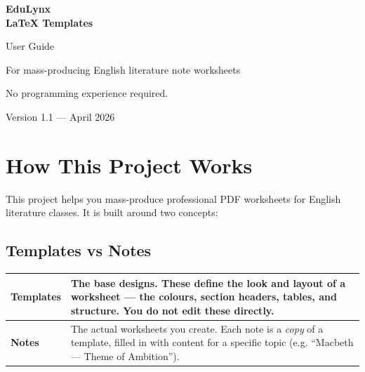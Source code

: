 \documentclass[a4paper,11pt]{article}
\begin{document}
\begin{titlepage}
\centering
\vspace*{4cm}

{\headingfont\fontsize{36pt}{42pt}\selectfont\bfseries\color{accent}
EduLynx\\LaTeX Templates}

\vspace{1cm}

{\fontsize{18pt}{22pt}\selectfont User Guide}

\vspace{2cm}

{\large For mass-producing English literature note worksheets}

\vspace{1cm}

{\color{gray} No programming experience required.}

\vfill

{\small Version 1.1 --- April 2026}
\end{titlepage}

\tableofcontents
\newpage

\section{How This Project Works}

This project helps you mass-produce professional PDF worksheets for English literature classes. It is built around two concepts:

\subsection{Templates vs Notes}

\begin{center}
\renewcommand{\arraystretch}{1.5}
\begin{tabularx}{\textwidth}{l X}
\toprule
\textbf{Templates} & The base designs. These define the look and layout of a worksheet --- the colours, section headers, tables, and structure. \textbf{You do not edit these directly.} \\
\midrule
\textbf{Notes} & The actual worksheets you create. Each note is a \textit{copy} of a template, filled in with content for a specific topic (e.g. ``Macbeth --- Theme of Ambition''). \\
\bottomrule
\end{tabularx}
\end{center}
\end{document}
